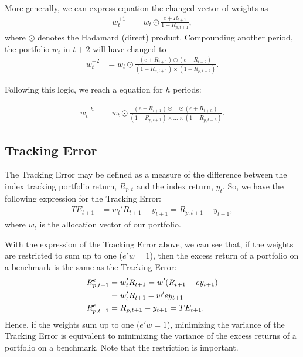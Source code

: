 \documentclass[12pt,oneside,a4paper]{memoir}
\begin{document}
More generally, we can express equation the changed vector of weights as
\begin{align}
	\label{eq:wplus1}
	w_{t}^{+1} &= w_{t} \odot \frac{e + R_{t+1}}{1 + R_{p,t+1}},
\end{align}
where $\odot$ denotes the Hadamard (direct) product.
Compounding another period, the portfolio $w_{t}$ in $t+2$ will have changed to
\begin{align*}
	w_{t}^{+2} &= w_{t} \odot 
	\frac{(e + R_{t+1})\odot(e + R_{t+2})}{(1 + R_{p,t+1})\times(1 + R_{p,t+2})}.
\end{align*}

Following this logic, we reach a equation for $h$ periods:

\begin{align}
	\label{eq:wplush}
	w_{t}^{+h} &= w_{t} \odot 
	\frac{(e + R_{t+1})\odot\dots\odot(e + R_{t+h})}
	{(1 + R_{p,t+1})\times \dots \times(1 + R_{p,t+h})}.
\end{align}

\subsection*{Tracking Error}

The Tracking Error may be defined as a measure of the difference between the index tracking portfolio return, $R_{p,t}$ and the index return, $y_{t}$.
So, we have the following expression for the Tracking Error:
\begin{align} 
	\label{eq:TE}
	TE_{t+1} &= w_{t}'R_{t+1} - y_{t+1} 
	= R_{p, t+1} - y_{t+1},
\end{align}
where $w_{t}$ is the allocation vector of our portfolio.

With the expression of the Tracking Error above, we can see that, if the weights are restricted to sum up to one ($e'w=1$), then the excess return of a portfolio on a benchmark is the same as the Tracking Error:
\begin{align}
	\notag
	R^{e}_{p,t+1} & = w_{t}'R_{t+1} = w'(R_{t+1} - e y_{t+1})
	\\
	\notag
	& = w_{t}'R_{t+1} - w'e y_{t+1}
	\\
	\label{eq:TER}
	R^{e}_{p,t+1} & = R_{p,t+1} - y_{t+1} = TE_{t+1}.
\end{align}
Hence, if the weights sum up to one ($e'w=1$), minimizing the variance of the Tracking Error is equivalent to minimizing the variance of the excess returns of a portfolio on a benchmark.
Note that the restriction is important.
\end{document}
